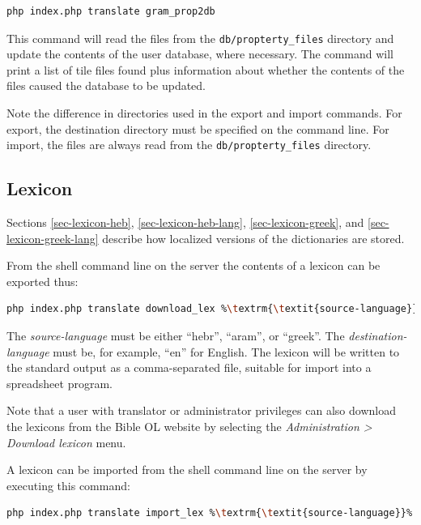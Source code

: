 \documentclass[11pt,oneside,a4paper]{memoir}
\begin{document}
\begin{lstlisting}[language=bash,basicstyle={\ttfamily}]
php index.php translate gram_prop2db
\end{lstlisting}

This command will read the files from the \texttt{db/propterty\_files} directory and update the contents of
the user database, where necessary. The command will print a list of tile files found plus
information about whether the contents of the files caused the database to be updated.

Note the difference in directories used in the export and import commands. For export, the
destination directory must be specified on the command line. For import, the files are always read
from the \texttt{db/propterty\_files} directory.

\subsection{Lexicon}

Sections \ref{sec-lexicon-heb}, \ref{sec-lexicon-heb-lang}, \ref{sec-lexicon-greek}, and
\ref{sec-lexicon-greek-lang} describe how localized versions of the dictionaries are stored.

From the shell command line on the server the contents of a lexicon can be exported thus:

\begin{lstlisting}[language=bash,basicstyle={\ttfamily}]
php index.php translate download_lex %\textrm{\textit{source-language}}% %\textrm{\textit{target-language}}%
\end{lstlisting}

The \emph{source-language} must be either ``hebr'', ``aram'', or ``greek''. The
\emph{destination-language} must be, for example, ``en'' for English. The lexicon will be written to
the standard output as a comma-separated file, suitable for import into a spreadsheet program.

Note that a user with translator or administrator privileges can also download the lexicons from the
Bible OL website by selecting the \emph{Administration > Download lexicon} menu.

A lexicon can be imported from the shell command line on the server by executing this command:

\begin{lstlisting}[language=bash,basicstyle={\ttfamily}]
php index.php translate import_lex %\textrm{\textit{source-language}}% %\textrm{\textit{target-language}}%  %\textrm{\textit{CSV-file}}%
\end{lstlisting}
\end{document}

